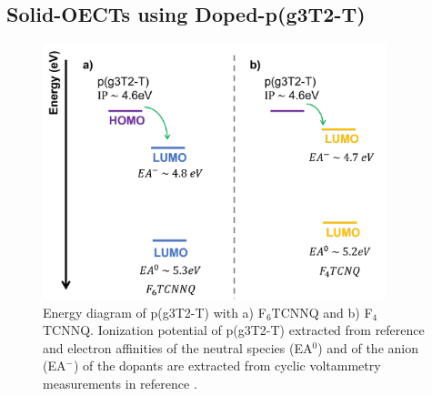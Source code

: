 \subsection{Solid-OECTs using Doped-p(g3T2-T)}

\begin{figure}
  \centering
  \includegraphics[width=10cm]{Images/pdf/dopingprocess.pdf}
  \caption[Energy diagram of p(g3T2-T) and dopants F$_{6}$TCNNQ and F$_{4}$TCNNQ]{Energy diagram of p(g3T2-T) with a) F$_{6}$TCNNQ and b) F$_{4}$TCNNQ. Ionization potential of p(g3T2-T) extracted from reference \cite{tanTuningOrganicElectrochemical2022} and electron affinities of the neutral species (EA$^{0}$) and of the anion (EA$^{-}$) of the dopants are extracted from cyclic voltammetry measurements in reference \cite{kieferDoubleDopingConjugated2019}.}
  \label{fig:doping}
\end{figure}



